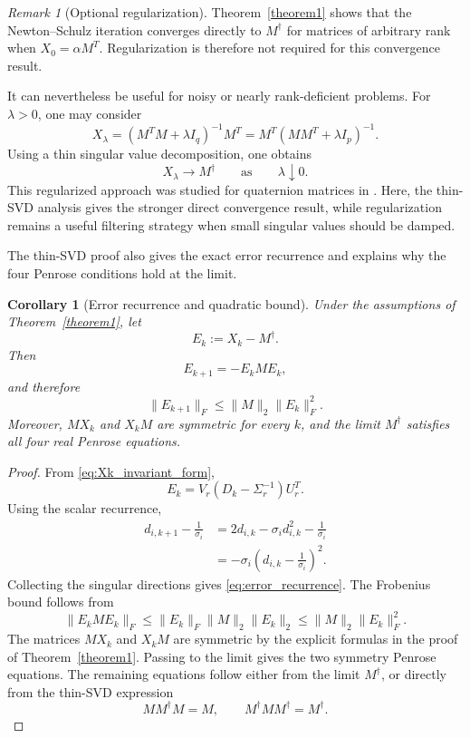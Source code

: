 \documentclass[12pt,a4paper]{article}
\theoremstyle{plain}
\newtheorem{corollary}[theorem]{Corollary}
\theoremstyle{definition}
\theoremstyle{remark}
\newtheorem{remark}[theorem]{Remark}
\begin{document}
\begin{remark}[Optional regularization]
Theorem~\ref{theorem1} shows that the Newton--Schulz iteration converges directly to \(M^\dagger\) for matrices of arbitrary rank when \(X_0=\alpha M^T\). Regularization is therefore not required for this convergence result.

It can nevertheless be useful for noisy or nearly rank-deficient problems. For \(\lambda>0\), one may consider
\[
    X_\lambda = (M^TM+\lambda I_q)^{-1}M^T = M^T(MM^T+\lambda I_p)^{-1}.
\]
Using a thin singular value decomposition, one obtains
\[
    X_\lambda\longrightarrow M^\dagger \qquad\text{as}\qquad \lambda\downarrow0.
\]
This regularized approach was studied for quaternion matrices in \cite{leplat2025iterative}. Here, the thin-SVD analysis gives the stronger direct convergence result, while regularization remains a useful filtering strategy when small singular values should be damped.
\end{remark}

The thin-SVD proof also gives the exact error recurrence and explains why the four Penrose conditions hold at the limit.

\begin{corollary}[Error recurrence and quadratic bound] \label{cor:NS_error_recurrence}
Under the assumptions of Theorem~\ref{theorem1}, let
\[
    E_k:=X_k-M^\dagger.
\]
Then
\begin{equation} \label{eq:error_recurrence}
    E_{k+1}=-E_kME_k,
\end{equation}
and therefore
\begin{equation} \label{eq:quadratic_F_bound}
    \|E_{k+1}\|_F \leq \|M\|_2\|E_k\|_F^2.
\end{equation}
Moreover, \(MX_k\) and \(X_kM\) are symmetric for every \(k\), and the limit \(M^\dagger\) satisfies all four real Penrose equations.
\end{corollary}

\begin{proof}
From \eqref{eq:Xk_invariant_form},
\[
    E_k =V_r(D_k-\Sigma_r^{-1})U_r^T.
\]
Using the scalar recurrence,
\begin{align*}
    d_{i,k+1}-\frac1{\sigma_i}
    &=2d_{i,k}-\sigma_i d_{i,k}^2-\frac1{\sigma_i}\\
    &=-\sigma_i\left(d_{i,k}-\frac1{\sigma_i}\right)^2.
\end{align*}
Collecting the singular directions gives \eqref{eq:error_recurrence}. The Frobenius bound follows from
\[
    \|E_kME_k\|_F \leq\|E_k\|_F\|M\|_2\|E_k\|_2 \leq\|M\|_2\|E_k\|_F^2.
\]
The matrices \(MX_k\) and \(X_kM\) are symmetric by the explicit formulas in the proof of Theorem~\ref{theorem1}. Passing to the limit gives the two symmetry Penrose equations. The remaining equations follow either from the limit \(M^\dagger\), or directly from the thin-SVD expression
\[
    MM^\dagger M=M, \qquad M^\dagger MM^\dagger=M^\dagger.
\]
\end{proof}
\end{document}
